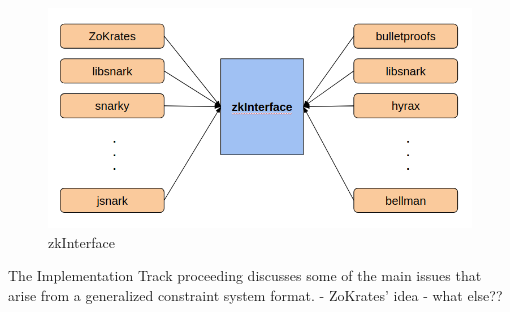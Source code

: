 \documentclass[a4paper,11pt]{article}
\begin{document}
		\begin{figure}[h!]
			\includegraphics[width=\linewidth]{interface.png}
			\caption{zkInterface}
			\label{interface}
		\end{figure}
		
		The Implementation Track proceeding discusses some of the main issues that arise from a generalized constraint system format. 
		- ZoKrates' idea
		- what else??
		
		
		
		

		
		
	
\end{document}
